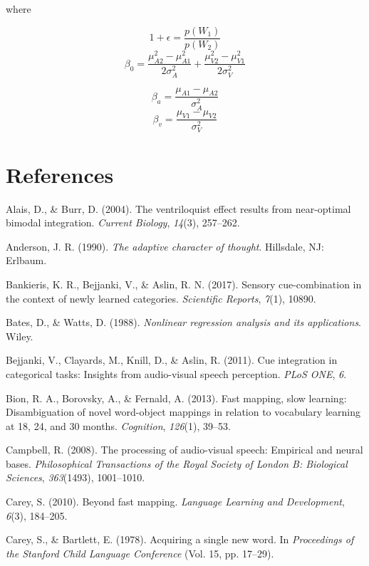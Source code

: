 \documentclass[english,man]{apa6}
\theoremstyle{definition}
\theoremstyle{definition}
\theoremstyle{definition}
\theoremstyle{remark}
\begin{document}
where

\[1+\epsilon=\frac{p(W_1)}{p(W_2)}\]
\[\beta_0=\frac{\mu^2_{A2}-\mu^2_{A1}}{2\sigma^2_{A}}+\frac{\mu^2_{V2}-\mu^2_{V1}}{2\sigma^2_{V}}\]

\[\beta_a=\frac{\mu_{A1}-\mu_{A2}}{\sigma^2_{A}}\]
\[\beta_v=\frac{\mu_{V1}-\mu_{V2}}{\sigma^2_{V}}\]

\section{References}\label{references}

\setlength{\parindent}{-0.5in} \setlength{\leftskip}{0.5in}

\hypertarget{refs}{}
\hypertarget{ref-alais04}{}
Alais, D., \& Burr, D. (2004). The ventriloquist effect results from
near-optimal bimodal integration. \emph{Current Biology}, \emph{14}(3),
257--262.

\hypertarget{ref-anderson90}{}
Anderson, J. R. (1990). \emph{The adaptive character of thought}.
Hillsdale, NJ: Erlbaum.

\hypertarget{ref-Bankieris17}{}
Bankieris, K. R., Bejjanki, V., \& Aslin, R. N. (2017). Sensory
cue-combination in the context of newly learned categories.
\emph{Scientific Reports}, \emph{7}(1), 10890.

\hypertarget{ref-bates88}{}
Bates, D., \& Watts, D. (1988). \emph{Nonlinear regression analysis and
its applications}. Wiley.

\hypertarget{ref-bejjanki2011}{}
Bejjanki, V., Clayards, M., Knill, D., \& Aslin, R. (2011). Cue
integration in categorical tasks: Insights from audio-visual speech
perception. \emph{PLoS ONE}, \emph{6}.

\hypertarget{ref-bion2013}{}
Bion, R. A., Borovsky, A., \& Fernald, A. (2013). Fast mapping, slow
learning: Disambiguation of novel word-object mappings in relation to
vocabulary learning at 18, 24, and 30 months. \emph{Cognition},
\emph{126}(1), 39--53.

\hypertarget{ref-Campbell2008}{}
Campbell, R. (2008). The processing of audio-visual speech: Empirical
and neural bases. \emph{Philosophical Transactions of the Royal Society
of London B: Biological Sciences}, \emph{363}(1493), 1001--1010.

\hypertarget{ref-carey2010}{}
Carey, S. (2010). Beyond fast mapping. \emph{Language Learning and
Development}, \emph{6}(3), 184--205.

\hypertarget{ref-carey1978b}{}
Carey, S., \& Bartlett, E. (1978). Acquiring a single new word. In
\emph{Proceedings of the Stanford Child Language Conference} (Vol. 15,
pp. 17--29).
\end{document}
